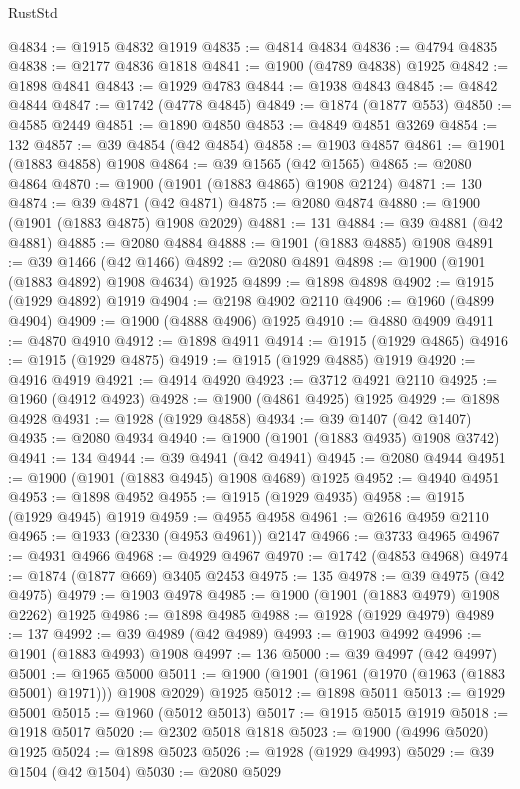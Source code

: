 \begin{lexlean}{RustStd}
\begin{coremodule}
@4834 := @1915 @4832 @1919
@4835 := @4814 @4834
@4836 := @4794 @4835
@4838 := @2177 @4836 @1818
@4841 := @1900 (@4789 @4838) @1925
@4842 := @1898 @4841
@4843 := @1929 @4783
@4844 := @1938 @4843
@4845 := @4842 @4844
@4847 := @1742 (@4778 @4845)
@4849 := @1874 (@1877 @553)
@4850 := @4585 @2449
@4851 := @1890 @4850
@4853 := @4849 @4851 @3269
@4854 := 132
@4857 := @39 @4854 (@42 @4854)
@4858 := @1903 @4857
@4861 := @1901 (@1883 @4858) @1908
@4864 := @39 @1565 (@42 @1565)
@4865 := @2080 @4864
@4870 := @1900 (@1901 (@1883 @4865) @1908 @2124)
@4871 := 130
@4874 := @39 @4871 (@42 @4871)
@4875 := @2080 @4874
@4880 := @1900 (@1901 (@1883 @4875) @1908 @2029)
@4881 := 131
@4884 := @39 @4881 (@42 @4881)
@4885 := @2080 @4884
@4888 := @1901 (@1883 @4885) @1908
@4891 := @39 @1466 (@42 @1466)
@4892 := @2080 @4891
@4898 := @1900 (@1901 (@1883 @4892) @1908 @4634) @1925
@4899 := @1898 @4898
@4902 := @1915 (@1929 @4892) @1919
@4904 := @2198 @4902 @2110
@4906 := @1960 (@4899 @4904)
@4909 := @1900 (@4888 @4906) @1925
@4910 := @4880 @4909
@4911 := @4870 @4910
@4912 := @1898 @4911
@4914 := @1915 (@1929 @4865)
@4916 := @1915 (@1929 @4875)
@4919 := @1915 (@1929 @4885) @1919
@4920 := @4916 @4919
@4921 := @4914 @4920
@4923 := @3712 @4921 @2110
@4925 := @1960 (@4912 @4923)
@4928 := @1900 (@4861 @4925) @1925
@4929 := @1898 @4928
@4931 := @1928 (@1929 @4858)
@4934 := @39 @1407 (@42 @1407)
@4935 := @2080 @4934
@4940 := @1900 (@1901 (@1883 @4935) @1908 @3742)
@4941 := 134
@4944 := @39 @4941 (@42 @4941)
@4945 := @2080 @4944
@4951 := @1900 (@1901 (@1883 @4945) @1908 @4689) @1925
@4952 := @4940 @4951
@4953 := @1898 @4952
@4955 := @1915 (@1929 @4935)
@4958 := @1915 (@1929 @4945) @1919
@4959 := @4955 @4958
@4961 := @2616 @4959 @2110
@4965 := @1933 (@2330 (@4953 @4961)) @2147
@4966 := @3733 @4965
@4967 := @4931 @4966
@4968 := @4929 @4967
@4970 := @1742 (@4853 @4968)
@4974 := @1874 (@1877 @669) @3405 @2453
@4975 := 135
@4978 := @39 @4975 (@42 @4975)
@4979 := @1903 @4978
@4985 := @1900 (@1901 (@1883 @4979) @1908 @2262) @1925
@4986 := @1898 @4985
@4988 := @1928 (@1929 @4979)
@4989 := 137
@4992 := @39 @4989 (@42 @4989)
@4993 := @1903 @4992
@4996 := @1901 (@1883 @4993) @1908
@4997 := 136
@5000 := @39 @4997 (@42 @4997)
@5001 := @1965 @5000
@5011 := @1900 (@1901 (@1961 (@1970 (@1963 (@1883 @5001) @1971))) @1908 @2029) @1925
@5012 := @1898 @5011
@5013 := @1929 @5001
@5015 := @1960 (@5012 @5013)
@5017 := @1915 @5015 @1919
@5018 := @1918 @5017
@5020 := @2302 @5018 @1818
@5023 := @1900 (@4996 @5020) @1925
@5024 := @1898 @5023
@5026 := @1928 (@1929 @4993)
@5029 := @39 @1504 (@42 @1504)
@5030 := @2080 @5029

\end{coremodule}
\end{lexlean}

